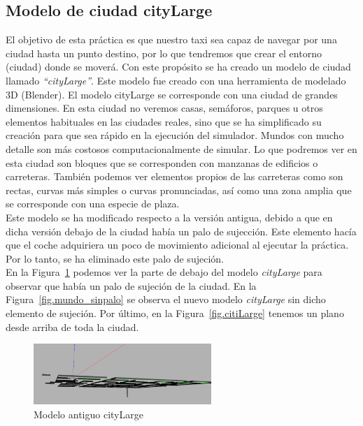 \subsection{Modelo de ciudad cityLarge}
El objetivo de esta práctica es que nuestro taxi sea capaz de navegar por una ciudad hasta un punto destino, por lo que tendremos que crear el entorno (ciudad) donde se moverá. Con este propósito se ha creado un modelo de ciudad llamado \textit{“cityLarge”}. Este modelo fue creado con una herramienta de modelado 3D (Blender). El modelo cityLarge se corresponde con una ciudad de grandes dimensiones. En esta ciudad no veremos casas, semáforos, parques u otros elementos habituales en las ciudades reales, sino que se ha simplificado su creación para que sea rápido en la ejecución del simulador. Mundos con mucho detalle son más costosos computacionalmente de simular. Lo que podremos ver en esta ciudad son bloques que se corresponden con manzanas de edificios o carreteras. También podemos ver elementos propios de las carreteras como son rectas, curvas más simples o curvas pronunciadas, así como una zona amplia que se corresponde con una especie de plaza.  \\

Este modelo se ha modificado respecto a la versión antigua, debido a que en dicha versión debajo de la ciudad había un palo de sujección. Este elemento hacía que el coche adquiriera un poco de movimiento adicional al ejecutar la práctica. Por lo tanto, se ha eliminado este palo de sujeción. \\

En la Figura~\ref{fig.mundo_palo} podemos ver la parte de debajo del modelo \textit{cityLarge} para observar que había un palo de sujeción de la ciudad. En la Figura~\ref{fig.mundo_sinpalo} se observa el nuevo modelo \textit{cityLarge} sin dicho elemento de sujeción. Por último, en la Figura~\ref{fig.citiLarge} tenemos un plano desde arriba de toda la ciudad.

\begin{figure}[H]
  \begin{center}
    \includegraphics[width=0.6\textwidth]{figures/GPP/Mundo_palo.png}
		\caption{Modelo antiguo cityLarge}
		\label{fig.mundo_palo}
		\end{center}
\end{figure}


